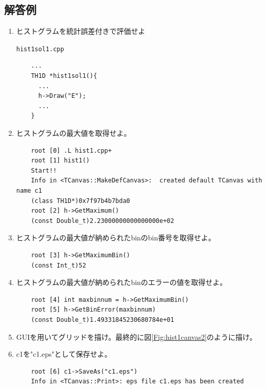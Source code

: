   \subsection{解答例}
  \begin{enumerate}
   \item ヒストグラムを統計誤差付きで評価せよ
	 \begin{itembox}{\texttt{hist1sol1.cpp}}
\begin{verbatim}
	...
	TH1D *hist1sol1(){
	  ...
	  h->Draw("E");
	  ...
	}
\end{verbatim}
	 \end{itembox}

   \item ヒストグラムの最大値を取得せよ。
\begin{verbatim}
	root [0] .L hist1.cpp+
	root [1] hist1()
	Start!!
	Info in <TCanvas::MakeDefCanvas>:  created default TCanvas with name c1
	(class TH1D*)0x7f97b4b7bda0
	root [2] h->GetMaximum()
	(const Double_t)2.23000000000000000e+02
\end{verbatim}
   \item ヒストグラムの最大値が納められたbinのbin番号を取得せよ。
\begin{verbatim}
	root [3] h->GetMaximumBin()
	(const Int_t)52
\end{verbatim}
   \item ヒストグラムの最大値が納められたbinのエラーの値を取得せよ。
\begin{verbatim}
	root [4] int maxbinnum = h->GetMaximumBin()
	root [5] h->GetBinError(maxbinnum)
	(const Double_t)1.49331845230680784e+01
\end{verbatim}
   \item GUIを用いてグリッドを描け。最終的に図\ref{Fig:hist1canvas2}のように描け。

   \item c1を"c1.eps"として保存せよ。
\begin{verbatim}
	root [6] c1->SaveAs("c1.eps")
	Info in <TCanvas::Print>: eps file c1.eps has been created
\end{verbatim}
  \end{enumerate}
  
